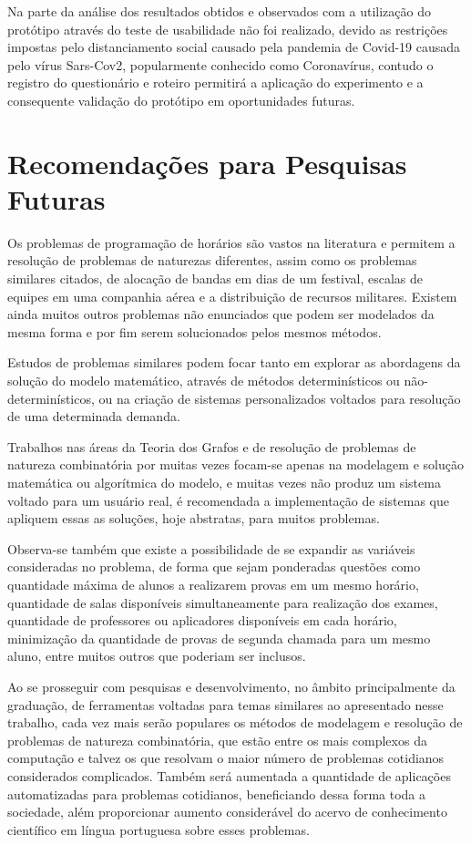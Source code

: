 Na parte da análise dos resultados obtidos e observados com a utilização do protótipo através do teste de usabilidade não foi realizado, devido as restrições impostas pelo distanciamento social causado pela pandemia de Covid-19 causada pelo vírus Sars-Cov2, popularmente conhecido como Coronavírus, contudo o registro do questionário e roteiro permitirá a aplicação do experimento e a consequente validação do protótipo em oportunidades futuras.


\section{Recomendações para Pesquisas Futuras}

Os problemas de programação de horários são vastos na literatura e permitem a resolução de problemas de naturezas diferentes, assim como os problemas similares citados, de alocação de bandas em dias de um festival, escalas de equipes em uma companhia aérea e a distribuição de recursos militares. Existem ainda muitos outros problemas não enunciados que podem ser modelados da mesma forma e por fim serem solucionados pelos mesmos métodos.

Estudos de problemas similares podem focar tanto em explorar as abordagens da solução do modelo matemático, através de métodos determinísticos ou não-determinísticos, ou na criação de sistemas personalizados voltados para resolução de uma determinada demanda.

Trabalhos nas áreas da Teoria dos Grafos e de resolução de problemas de natureza combinatória por muitas vezes focam-se apenas na modelagem e solução matemática ou algorítmica do modelo, e muitas vezes não produz um sistema voltado para um usuário real, é recomendada a implementação de sistemas que apliquem essas as soluções, hoje abstratas, para muitos problemas.

Observa-se também que existe a possibilidade de se expandir as variáveis consideradas no problema, de forma que sejam ponderadas questões como quantidade máxima de alunos a realizarem provas em um mesmo horário, quantidade de salas disponíveis simultaneamente para realização dos exames, quantidade de professores ou aplicadores disponíveis em cada horário, minimização da quantidade de provas de segunda chamada para um mesmo aluno, entre muitos outros que poderiam ser inclusos.

Ao se prosseguir com pesquisas e desenvolvimento, no âmbito principalmente da graduação, de ferramentas voltadas para temas similares ao apresentado nesse trabalho, cada vez mais serão populares os métodos de modelagem e resolução de problemas de natureza combinatória, que estão entre os mais complexos da computação e talvez os que resolvam o maior número de problemas cotidianos considerados complicados. Também será aumentada a quantidade de aplicações automatizadas para problemas cotidianos, beneficiando dessa forma toda a sociedade, além proporcionar aumento considerável do acervo de conhecimento científico em língua portuguesa sobre esses problemas.